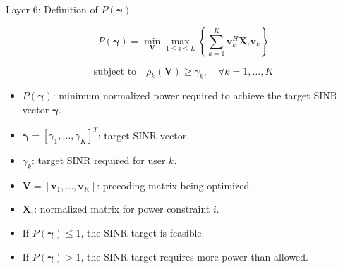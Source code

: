 \documentclass{beamer}
\begin{document}
\begin{frame}{Layer 6: Definition of \(P(\boldsymbol{\gamma})\)}
\scriptsize

\[
P(\boldsymbol{\gamma})
=
\min_{\mathbf{V}}
\max_{1\le i\le L}
\left\{
\sum_{k=1}^{K}
\mathbf{v}_k^H\mathbf{X}_i\mathbf{v}_k
\right\}
\]

\[
\text{subject to}
\quad
\rho_k(\mathbf{V})\ge \gamma_k,
\quad \forall k=1,\ldots,K
\]

\begin{itemize}
    \item \(P(\boldsymbol{\gamma})\): minimum normalized power required to achieve the target SINR vector \(\boldsymbol{\gamma}\).
    \item \(\boldsymbol{\gamma}=[\gamma_1,\ldots,\gamma_K]^T\): target SINR vector.
    \item \(\gamma_k\): target SINR required for user \(k\).
    \item \(\mathbf{V}=[\mathbf{v}_1,\ldots,\mathbf{v}_K]\): precoding matrix being optimized.
    \item \(\mathbf{X}_i\): normalized matrix for power constraint \(i\).
    \item If \(P(\boldsymbol{\gamma})\le 1\), the SINR target is feasible.
    \item If \(P(\boldsymbol{\gamma})>1\), the SINR target requires more power than allowed.
\end{itemize}

\end{frame}
\end{document}
